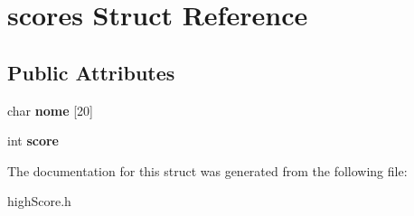 \hypertarget{structscores}{}\section{scores Struct Reference}
\label{structscores}
\subsection*{Public Attributes}
\begin{DoxyCompactItemize}
\item 
char {\bfseries nome} \mbox{[}20\mbox{]}\hypertarget{structscores_a5b7aa6eb9f5173203ea034edda1ff5d9}{}\label{structscores_a5b7aa6eb9f5173203ea034edda1ff5d9}

\item 
int {\bfseries score}\hypertarget{structscores_a1ba70516e189cd401471f37822487a8b}{}\label{structscores_a1ba70516e189cd401471f37822487a8b}

\end{DoxyCompactItemize}


The documentation for this struct was generated from the following file\+:\begin{DoxyCompactItemize}
\item 
high\+Score.\+h\end{DoxyCompactItemize}
